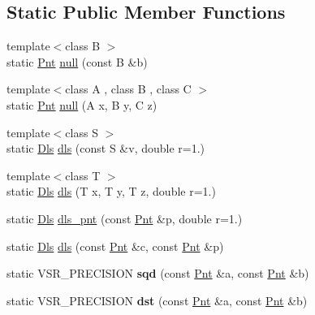 \subsection*{Static Public Member Functions}
\begin{DoxyCompactItemize}
\item 
{\footnotesize template$<$class B $>$ }\\static \hyperlink{namespacevsr_a2d05beb9721c5d9211b479af6d47222d}{Pnt} \hyperlink{structvsr_1_1_ro_aaf99e1c2cdfbceb4080541016814ae5b}{null} (const B \&b)
\item 
{\footnotesize template$<$class A , class B , class C $>$ }\\static \hyperlink{namespacevsr_a2d05beb9721c5d9211b479af6d47222d}{Pnt} \hyperlink{structvsr_1_1_ro_ae8a9cbedc4f999ce551969ebc5942729}{null} (A x, B y, C z)
\item 
{\footnotesize template$<$class S $>$ }\\static \hyperlink{classvsr_1_1_m_v}{Dls} \hyperlink{structvsr_1_1_ro_a38ad7d450cb8387524c17fda3a3064f2}{dls} (const S \&v, double r=1.)
\item 
{\footnotesize template$<$class T $>$ }\\static \hyperlink{classvsr_1_1_m_v}{Dls} \hyperlink{structvsr_1_1_ro_a177c80397ffe0fdb5c7c83c6d6ddc01a}{dls} (T x, T y, T z, double r=1.)
\item 
static \hyperlink{classvsr_1_1_m_v}{Dls} \hyperlink{structvsr_1_1_ro_acecccbe45afd822e177aefd17b024f28}{dls\-\_\-pnt} (const \hyperlink{namespacevsr_a2d05beb9721c5d9211b479af6d47222d}{Pnt} \&p, double r=1.)
\item 
static \hyperlink{classvsr_1_1_m_v}{Dls} \hyperlink{structvsr_1_1_ro_a280dd9aa74ed5f3de0186c77ff4849a8}{dls} (const \hyperlink{namespacevsr_a2d05beb9721c5d9211b479af6d47222d}{Pnt} \&c, const \hyperlink{namespacevsr_a2d05beb9721c5d9211b479af6d47222d}{Pnt} \&p)
\item 
\hypertarget{structvsr_1_1_ro_a1eddd38403e5e9ab4cc8437d7383d424}{static V\-S\-R\-\_\-\-P\-R\-E\-C\-I\-S\-I\-O\-N {\bfseries sqd} (const \hyperlink{namespacevsr_a2d05beb9721c5d9211b479af6d47222d}{Pnt} \&a, const \hyperlink{namespacevsr_a2d05beb9721c5d9211b479af6d47222d}{Pnt} \&b)}\label{structvsr_1_1_ro_a1eddd38403e5e9ab4cc8437d7383d424}

\item 
\hypertarget{structvsr_1_1_ro_a1fb2319b602cfc011860a6da60e8f981}{static V\-S\-R\-\_\-\-P\-R\-E\-C\-I\-S\-I\-O\-N {\bfseries dst} (const \hyperlink{namespacevsr_a2d05beb9721c5d9211b479af6d47222d}{Pnt} \&a, const \hyperlink{namespacevsr_a2d05beb9721c5d9211b479af6d47222d}{Pnt} \&b)}\label{structvsr_1_1_ro_a1fb2319b602cfc011860a6da60e8f981}


\end{DoxyCompactItemize}
